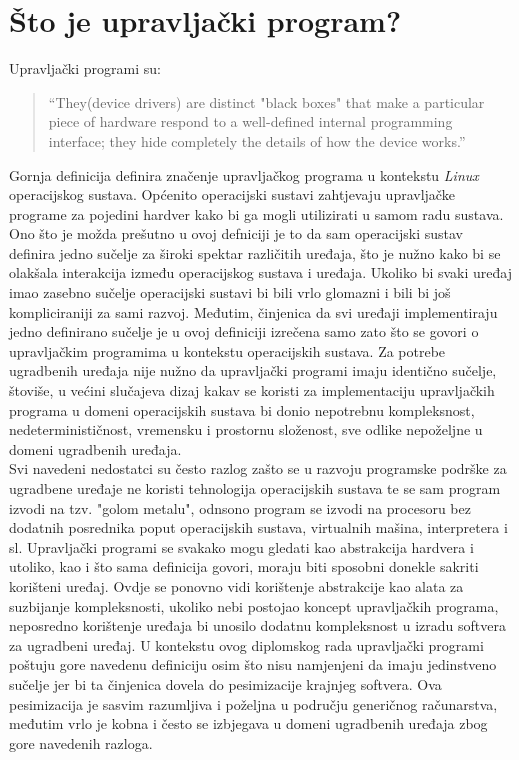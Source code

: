 \section{Što je upravljački program?}
Upravljački programi su\cite{linuxDeviceDrivers}:
\begin{quote}
    ``They(device drivers) are distinct "black boxes" that make a particular piece of hardware respond to a well-defined internal programming interface; they hide completely the details of how the device works.''
\end{quote}
Gornja definicija definira značenje upravljačkog programa u kontekstu \textit{Linux} operacijskog sustava. Općenito operacijski sustavi zahtjevaju upravljačke programe za pojedini hardver kako bi ga mogli utilizirati u samom radu sustava. Ono što je možda prešutno u ovoj defniciji je to da sam operacijski sustav definira jedno sučelje za široki spektar različitih uređaja, što je nužno kako bi se olakšala interakcija između operacijskog sustava i uređaja. Ukoliko bi svaki uređaj imao zasebno sučelje operacijski sustavi bi bili vrlo glomazni i bili bi još kompliciraniji za sami razvoj. Međutim, činjenica da svi uređaji implementiraju jedno definirano sučelje je u ovoj definiciji izrečena samo zato što se govori o upravljačkim programima u kontekstu operacijskih sustava. Za potrebe ugradbenih uređaja nije nužno da upravljački programi imaju identično sučelje, štoviše, u većini slučajeva dizaj kakav se koristi za implementaciju upravljačkih programa u domeni operacijskih sustava bi donio nepotrebnu kompleksnost, nedeterminističnost, vremensku i prostornu složenost, sve odlike nepoželjne u domeni ugradbenih uređaja. \\
Svi navedeni nedostatci su često razlog zašto se u razvoju programske podrške za ugradbene uređaje ne koristi tehnologija operacijskih sustava te se sam program izvodi na tzv. "golom metalu", odnsono program se izvodi na procesoru bez dodatnih posrednika poput operacijskih sustava, virtualnih mašina, interpretera i sl. Upravljački programi se svakako mogu gledati kao abstrakcija hardvera i utoliko, kao i što sama definicija govori, moraju biti sposobni donekle sakriti korišteni uređaj. Ovdje se ponovno vidi korištenje abstrakcije kao alata za suzbijanje kompleksnosti, ukoliko nebi postojao koncept upravljačkih programa, neposredno korištenje uređaja bi unosilo dodatnu kompleksnost u izradu softvera za ugradbeni uređaj. U kontekstu ovog diplomskog rada upravljački programi poštuju gore navedenu definiciju osim što nisu namjenjeni da imaju jedinstveno sučelje jer bi ta činjenica dovela do pesimizacije krajnjeg softvera. Ova pesimizacija je sasvim razumljiva i poželjna u području generičnog računarstva, međutim vrlo je kobna i često se izbjegava u domeni ugradbenih uređaja zbog gore navedenih razloga. 
\pagebreak

